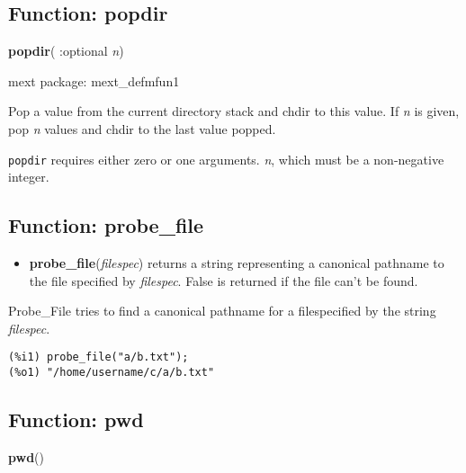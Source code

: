 \documentclass[]{article}
\begin{document}
\vspace{5 pt}


\subsection{Function: popdir\label{sec:popdir}}
\hypertarget{popdir}{}
{\bf popdir}( :optional {\it n})


\noindent mext package: mext\_defmfun1



\vspace{5 pt}
Pop a value from the current directory stack and chdir to this value. If {\it n} is given, pop {\it n} values and chdir to the last value popped. 

\vspace{5 pt}

   {\tt popdir} requires either zero or one arguments.
 {\it n}, which must be a non-negative integer.


\vspace{5 pt}


\subsection{Function: probe\_file\label{sec:probe_file}}
\hypertarget{probe_file}{}



\vspace{5 pt}
\begin{itemize}
\item[] {\bf probe\_file}({\it filespec})
  returns a string representing a canonical pathname to the file specified by {\it filespec}. False is returned if the file can't be found. 

\end{itemize}
Probe\_File tries to find a canonical pathname for a filespecified by the string {\it filespec}. 

\vspace{5 pt}


\begin{Verbatim}[frame=single]
(%i1) probe_file("a/b.txt");
(%o1) "/home/username/c/a/b.txt"
\end{Verbatim}


\subsection{Function: pwd\label{sec:pwd}}
\hypertarget{pwd}{}
{\bf pwd}()
\end{document}
